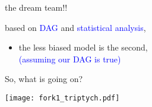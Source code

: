 %
%
\begin{lhframe}[rhgraphic={\texttt{[image: fork1\_reg2.png]}}]
	{the dream team!!}
	
	based on \textcolor{blue}{DAG} and \textcolor{blue}{statistical analysis},
	\begin{itemize}
		\item the less biased model is the second, \\
		{\small \textcolor{blue}{(assuming our DAG is true)} }
	\end{itemize}
\end{lhframe}
%
%
\begin{frame}
	{So, what is going on?}
	
	\begin{figure*}
		\texttt{[image: fork1\_triptych.pdf]}
	\end{figure*}
\end{frame}
%
%
